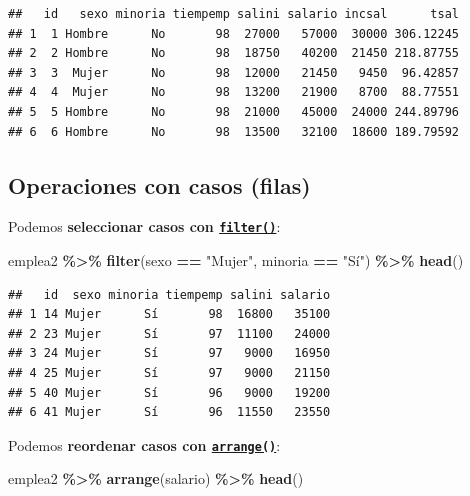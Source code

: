 \documentclass[
]{book}
\newenvironment{Shaded}{\begin{snugshade}}{\end{snugshade}}
\newcommand{\FunctionTok}[1]{\textcolor[rgb]{0.13,0.29,0.53}{\textbf{#1}}}
\newcommand{\NormalTok}[1]{#1}
\newcommand{\SpecialCharTok}[1]{\textcolor[rgb]{0.81,0.36,0.00}{\textbf{#1}}}
\newcommand{\StringTok}[1]{\textcolor[rgb]{0.31,0.60,0.02}{#1}}
\begin{document}
\begin{verbatim}
##   id   sexo minoria tiempemp salini salario incsal      tsal
## 1  1 Hombre      No       98  27000   57000  30000 306.12245
## 2  2 Hombre      No       98  18750   40200  21450 218.87755
## 3  3  Mujer      No       98  12000   21450   9450  96.42857
## 4  4  Mujer      No       98  13200   21900   8700  88.77551
## 5  5 Hombre      No       98  21000   45000  24000 244.89796
## 6  6 Hombre      No       98  13500   32100  18600 189.79592
\end{verbatim}

\hypertarget{dplyr-casos}{%
\subsection{Operaciones con casos (filas)}\label{dplyr-casos}}

Podemos \textbf{seleccionar casos con \href{https://dplyr.tidyverse.org/reference/filter.html}{\texttt{filter()}}}:

\begin{Shaded}
\begin{Highlighting}[]
\NormalTok{emplea2 }\SpecialCharTok{\%\textgreater{}\%} \FunctionTok{filter}\NormalTok{(sexo }\SpecialCharTok{==} \StringTok{"Mujer"}\NormalTok{, minoria }\SpecialCharTok{==} \StringTok{"Sí"}\NormalTok{) }\SpecialCharTok{\%\textgreater{}\%} \FunctionTok{head}\NormalTok{()}
\end{Highlighting}
\end{Shaded}

\begin{verbatim}
##   id  sexo minoria tiempemp salini salario
## 1 14 Mujer      Sí       98  16800   35100
## 2 23 Mujer      Sí       97  11100   24000
## 3 24 Mujer      Sí       97   9000   16950
## 4 25 Mujer      Sí       97   9000   21150
## 5 40 Mujer      Sí       96   9000   19200
## 6 41 Mujer      Sí       96  11550   23550
\end{verbatim}

Podemos \textbf{reordenar casos con \href{https://dplyr.tidyverse.org/reference/arrange.html}{\texttt{arrange()}}}:

\begin{Shaded}
\begin{Highlighting}[]
\NormalTok{emplea2 }\SpecialCharTok{\%\textgreater{}\%} \FunctionTok{arrange}\NormalTok{(salario) }\SpecialCharTok{\%\textgreater{}\%} \FunctionTok{head}\NormalTok{()}
\end{Highlighting}
\end{Shaded}
\end{document}

